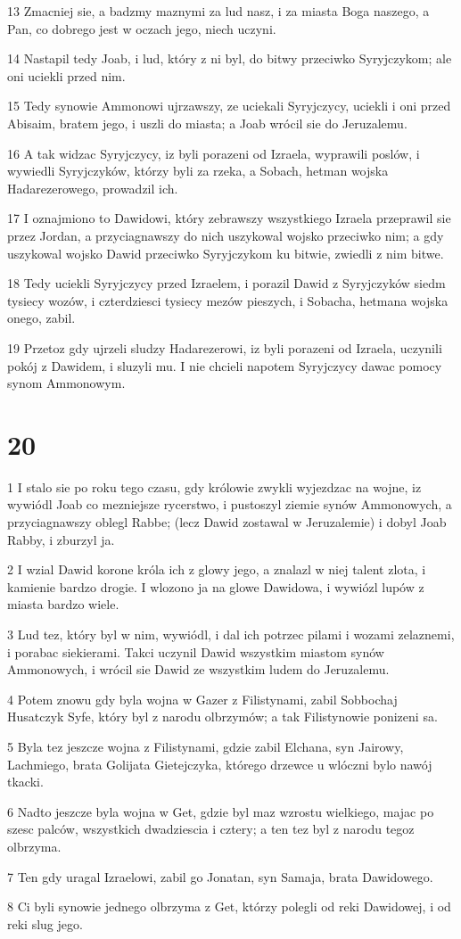 \par 13 Zmacniej sie, a badzmy maznymi za lud nasz, i za miasta Boga naszego, a Pan, co dobrego jest w oczach jego, niech uczyni.
\par 14 Nastapil tedy Joab, i lud, który z ni byl, do bitwy przeciwko Syryjczykom; ale oni uciekli przed nim.
\par 15 Tedy synowie Ammonowi ujrzawszy, ze uciekali Syryjczycy, uciekli i oni przed Abisaim, bratem jego, i uszli do miasta; a Joab wrócil sie do Jeruzalemu.
\par 16 A tak widzac Syryjczycy, iz byli porazeni od Izraela, wyprawili poslów, i wywiedli Syryjczyków, którzy byli za rzeka, a Sobach, hetman wojska Hadarezerowego, prowadzil ich.
\par 17 I oznajmiono to Dawidowi, który zebrawszy wszystkiego Izraela przeprawil sie przez Jordan, a przyciagnawszy do nich uszykowal wojsko przeciwko nim; a gdy uszykowal wojsko Dawid przeciwko Syryjczykom ku bitwie, zwiedli z nim bitwe.
\par 18 Tedy uciekli Syryjczycy przed Izraelem, i porazil Dawid z Syryjczyków siedm tysiecy wozów, i czterdziesci tysiecy mezów pieszych, i Sobacha, hetmana wojska onego, zabil.
\par 19 Przetoz gdy ujrzeli sludzy Hadarezerowi, iz byli porazeni od Izraela, uczynili pokój z Dawidem, i sluzyli mu. I nie chcieli napotem Syryjczycy dawac pomocy synom Ammonowym.

\chapter{20}

\par 1 I stalo sie po roku tego czasu, gdy królowie zwykli wyjezdzac na wojne, iz wywiódl Joab co mezniejsze rycerstwo, i pustoszyl ziemie synów Ammonowych, a przyciagnawszy oblegl Rabbe; (lecz Dawid zostawal w Jeruzalemie) i dobyl Joab Rabby, i zburzyl ja.
\par 2 I wzial Dawid korone króla ich z glowy jego, a znalazl w niej talent zlota, i kamienie bardzo drogie. I wlozono ja na glowe Dawidowa, i wywiózl lupów z miasta bardzo wiele.
\par 3 Lud tez, który byl w nim, wywiódl, i dal ich potrzec pilami i wozami zelaznemi, i porabac siekierami. Takci uczynil Dawid wszystkim miastom synów Ammonowych, i wrócil sie Dawid ze wszystkim ludem do Jeruzalemu.
\par 4 Potem znowu gdy byla wojna w Gazer z Filistynami, zabil Sobbochaj Husatczyk Syfe, który byl z narodu olbrzymów; a tak Filistynowie ponizeni sa.
\par 5 Byla tez jeszcze wojna z Filistynami, gdzie zabil Elchana, syn Jairowy, Lachmiego, brata Golijata Gietejczyka, którego drzewce u wlóczni bylo nawój tkacki.
\par 6 Nadto jeszcze byla wojna w Get, gdzie byl maz wzrostu wielkiego, majac po szesc palców, wszystkich dwadziescia i cztery; a ten tez byl z narodu tegoz olbrzyma.
\par 7 Ten gdy uragal Izraelowi, zabil go Jonatan, syn Samaja, brata Dawidowego.
\par 8 Ci byli synowie jednego olbrzyma z Get, którzy polegli od reki Dawidowej, i od reki slug jego.

